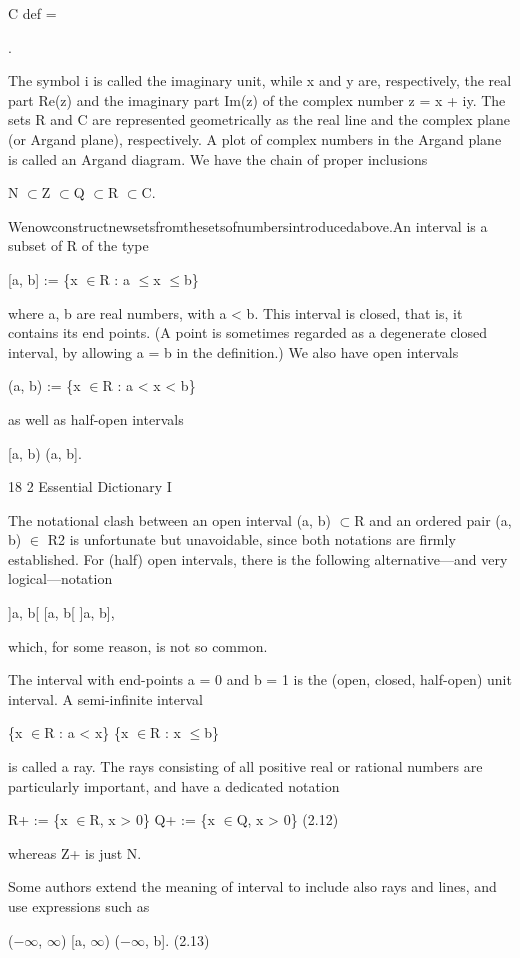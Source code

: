 \documentclass[11pt]{article}
\theoremstyle{plain}
\theoremstyle{definition}
\begin{document}
C def =

.

The symbol i is called the imaginary unit, while x and y are, respectively, the real part Re(z) and the imaginary part Im(z) of the complex number z = x + iy. The sets R and C are represented geometrically as the real line and the complex plane (or Argand plane), respectively. A plot of complex numbers in the Argand plane is called an Argand diagram. We have the chain of proper inclusions

N $\subset$Z $\subset$Q $\subset$R $\subset$C.

Wenowconstructnewsetsfromthesetsofnumbersintroducedabove.An interval is a subset of R of the type

[a, b] := \{x $\in$R : a $\leq$x $\leq$b\}

where a, b are real numbers, with a < b. This interval is closed, that is, it contains its end points. (A point is sometimes regarded as a degenerate closed interval, by allowing a = b in the definition.) We also have open intervals

(a, b) := \{x $\in$R : a < x < b\}

as well as half-open intervals

[a, b) (a, b].

18 2 Essential Dictionary I

The notational clash between an open interval (a, b) $\subset$R and an ordered pair (a, b) $\in$ R2 is unfortunate but unavoidable, since both notations are firmly established. For (half) open intervals, there is the following alternative---and very logical---notation

]a, b[ [a, b[ ]a, b],

which, for some reason, is not so common.

The interval with end-points a = 0 and b = 1 is the (open, closed, half-open) unit interval. A semi-infinite interval

\{x $\in$R : a < x\} \{x $\in$R : x $\leq$b\}

is called a ray. The rays consisting of all positive real or rational numbers are particularly important, and have a dedicated notation

R+ := \{x $\in$R, x > 0\} Q+ := \{x $\in$Q, x > 0\} (2.12)

whereas Z+ is just N.

Some authors extend the meaning of interval to include also rays and lines, and use expressions such as

($-$$\infty$, $\infty$) [a, $\infty$) ($-$$\infty$, b]. (2.13)
\end{document}
